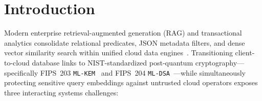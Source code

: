 \documentclass[10pt,journal,compsoc]{IEEEtran}
\begin{document}
\maketitle
\IEEEdisplaynontitleabstractindextext
\IEEEpeerreviewmaketitle

\section{Introduction}
Modern enterprise retrieval-augmented generation (RAG) and transactional analytics consolidate relational predicates, JSON metadata filters, and dense vector similarity search within unified cloud data engines~\cite{wang2021milvus,malkov2018hnsw}. Transitioning client-to-cloud database links to NIST-standardized post-quantum cryptography---specifically FIPS~203 \texttt{ML-KEM}~\cite{fips203} and FIPS~204 \texttt{ML-DSA}~\cite{fips204}---while simultaneously protecting sensitive query embeddings against untrusted cloud operators exposes three interacting systems challenges:
\end{document}

